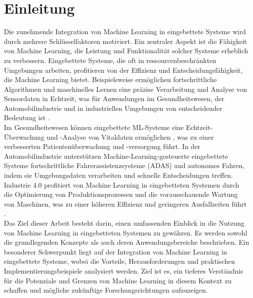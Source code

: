 \chapter{Einleitung}
Die zunehmende Integration von Machine Learning in eingebettete Systeme wird durch mehrere Schlüsselfaktoren motiviert. Ein zentraler Aspekt ist die Fähigkeit von Machine Learning, die Leistung und Funktionalität solcher Systeme erheblich zu verbessern. Eingebettete Systeme, die oft in ressourcenbeschränkten Umgebungen arbeiten, profitieren von der Effizienz und Entscheidungsfähigkeit, die Machine Learning bietet. Beispielsweise ermöglichen fortschrittliche Algorithmen und maschinelles Lernen eine präzise Verarbeitung und Analyse von Sensordaten in Echtzeit, was für Anwendungen im Gesundheitswesen, der Automobilindustrie und in industriellen Umgebungen von entscheidender Bedeutung ist \cite{Gembaczka.2019}.\\
Im Gesundheitswesen können eingebettete ML-Systeme eine Echtzeit-Überwachung und -Analyse von Vitaldaten ermöglichen \cite{Gembaczka.2019}, was zu einer verbesserten Patientenüberwachung und -versorgung führt. In der Automobilindustrie unterstützen Machine-Learning-gesteuerte eingebettete Systeme fortschrittliche Fahrerassistenzsysteme (ADAS) und autonomes Fahren, indem sie Umgebungsdaten verarbeiten und schnelle Entscheidungen treffen. Industrie 4.0 profitiert von Machine Learning in eingebetteten Systemen durch die Optimierung von Produktionsprozessen und die vorausschauende Wartung von Maschinen, was zu einer höheren Effizienz und geringeren Ausfallzeiten führt \cite{Gembaczka.2019}.\\
Das Ziel dieser Arbeit besteht darin, einen umfassenden Einblick in die Nutzung von Machine Learning in eingebetteten Systemen zu gewähren. Es werden sowohl die grundlegenden Konzepte als auch deren Anwendungsbereiche beschrieben. Ein besonderer Schwerpunkt liegt auf der Integration von Machine Learning in eingebettete Systeme, wobei die Vorteile, Herausforderungen und praktischen Implementierungsbeispiele analysiert werden. Ziel ist es, ein tieferes Verständnis für die Potenziale und Grenzen von Machine Learning in diesem Kontext zu schaffen und mögliche zukünftige Forschungsrichtungen aufzuzeigen.